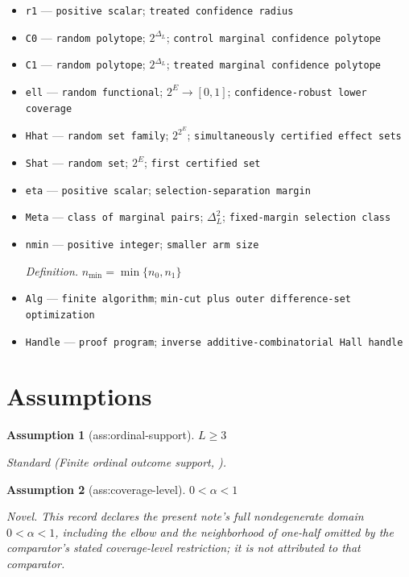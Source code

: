 \documentclass{article}
\newtheorem{assumption}{Assumption}
\begin{document}
\begin{itemize}
  \item \texttt{r1} --- \texttt{positive scalar}; \texttt{treated confidence radius}
  \item \texttt{C0} --- \texttt{random polytope}; \(2^{\Delta_L}\); \texttt{control marginal confidence polytope}
  \item \texttt{C1} --- \texttt{random polytope}; \(2^{\Delta_L}\); \texttt{treated marginal confidence polytope}
  \item \texttt{ell} --- \texttt{random functional}; \(2^E\to[0,1]\); \texttt{confidence-\allowbreak{}robust lower coverage}
  \item \texttt{Hhat} --- \texttt{random set family}; \(2^{2^E}\); \texttt{simultaneously certified effect sets}
  \item \texttt{Shat} --- \texttt{random set}; \(2^E\); \texttt{first certified set}
  \item \texttt{eta} --- \texttt{positive scalar}; \texttt{selection-\allowbreak{}separation margin}
  \item \texttt{Meta} --- \texttt{class of marginal pairs}; \(\Delta_L^2\); \texttt{fixed-\allowbreak{}margin selection class}
  \item \texttt{nmin} --- \texttt{positive integer}; \texttt{smaller arm size}
  \par\smallskip\noindent\emph{Definition.} \(n_{\min}=\min\{n_0,n_1\}\)
  \item \texttt{Alg} --- \texttt{finite algorithm}; \texttt{min-\allowbreak{}cut plus outer difference-\allowbreak{}set optimization}
  \item \texttt{Handle} --- \texttt{proof program}; \texttt{inverse additive-\allowbreak{}combinatorial Hall handle}
\end{itemize}

\section{Assumptions}

\begin{assumption}[ass:ordinal-support]\label{ass:ordinal-support}
\(L\geq3\)
\par\smallskip\noindent\emph{Standard} (Finite ordinal outcome support, \cite{ZhangRichardson2025}).
\end{assumption}

\begin{assumption}[ass:coverage-level]\label{ass:coverage-level}
\(0<\alpha<1\)
\par\smallskip\noindent\emph{Novel.} This record declares the present note's full nondegenerate domain \(0<\alpha<1\), including the elbow and the neighborhood of one-half omitted by the comparator's stated coverage-level restriction; it is not attributed to that comparator.
\end{assumption}
\end{document}
